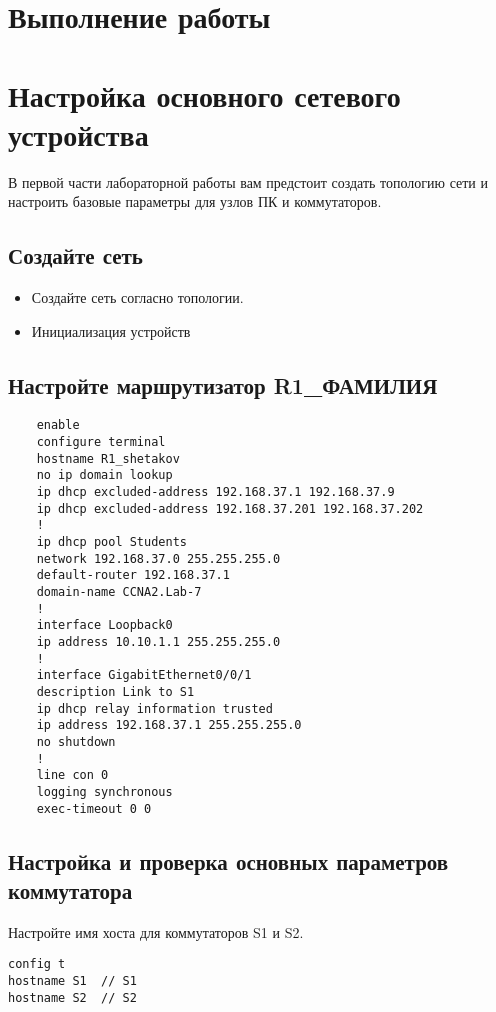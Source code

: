 \section*{\LARGE Выполнение работы}


\section{Настройка основного сетевого устройства}
В первой части лабораторной работы вам предстоит создать топологию сети и настроить базовые
параметры для узлов ПК и коммутаторов.

\subsection{Создайте сеть}
\begin{itemize}
    \item Создайте сеть согласно топологии.
    \item Инициализация устройств
\end{itemize}

\subsection{Настройте маршрутизатор R1\_ФАМИЛИЯ}
\begin{verbatim}
    enable
    configure terminal
    hostname R1_shetakov
    no ip domain lookup
    ip dhcp excluded-address 192.168.37.1 192.168.37.9
    ip dhcp excluded-address 192.168.37.201 192.168.37.202
    !
    ip dhcp pool Students
    network 192.168.37.0 255.255.255.0
    default-router 192.168.37.1
    domain-name CCNA2.Lab-7
    !
    interface Loopback0
    ip address 10.10.1.1 255.255.255.0
    !
    interface GigabitEthernet0/0/1
    description Link to S1
    ip dhcp relay information trusted
    ip address 192.168.37.1 255.255.255.0
    no shutdown
    !
    line con 0
    logging synchronous
    exec-timeout 0 0
\end{verbatim}


\subsection{Настройка и проверка основных параметров коммутатора}
Настройте имя хоста для коммутаторов S1 и S2.

\begin{verbatim}
config t
hostname S1  // S1
hostname S2  // S2
\end{verbatim}

